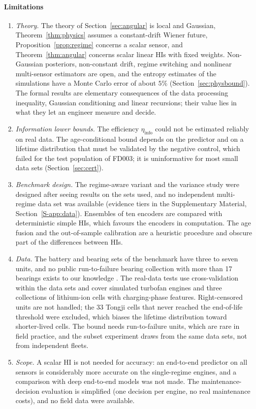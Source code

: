 \documentclass[preprint,12pt]{elsarticle}
\theoremstyle{definition}
\newcommand{\etaPIE}{\eta_{\mathrm{info}}}
\begin{document}
\paragraph{Limitations}
\begin{enumerate}
\item \emph{Theory.} The theory of Section~\ref{sec:angular} is local and Gaussian, Theorem~\ref{thm:physics} assumes a constant-drift Wiener future, Proposition~\ref{prop:regime} concerns a scalar sensor, and Theorem~\ref{thm:angular} concerns scalar linear HIs with fixed weights. Non-Gaussian posteriors, non-constant drift, regime switching and nonlinear multi-sensor estimators are open, and the entropy estimates of the simulations have a Monte Carlo error of about $5\%$ (Section~\ref{sec:physbound}). The formal results are elementary consequences of the data processing inequality, Gaussian conditioning and linear recursions; their value lies in what they let an engineer measure and decide.
\item \emph{Information lower bounds.} The efficiency $\etaPIE$ could not be estimated reliably on real data. The age-conditional bound depends on the predictor and on a lifetime distribution that must be validated by the negative control, which failed for the test population of FD003; it is uninformative for most small data sets (Section~\ref{sec:cert}).
\item \emph{Benchmark design.} The regime-aware variant and the variance study were designed after seeing results on the sets used, and no independent multi-regime data set was available (evidence tiers in the Supplementary Material, Section~\ref{S-app:data}). Ensembles of ten encoders are compared with deterministic simple HIs, which favours the encoders in computation. The age fusion and the out-of-sample calibration are a heuristic procedure and obscure part of the differences between HIs.
\item \emph{Data.} The battery and bearing sets of the benchmark have three to seven units, and no public run-to-failure bearing collection with more than 17 bearings exists to our knowledge \cite{mauthe2024}. The real-data tests use cross-validation within the data sets and cover simulated turbofan engines and three collections of lithium-ion cells with charging-phase features. Right-censored units are not handled; the $33$ Tongji cells that never reached the end-of-life threshold were excluded, which biases the lifetime distribution toward shorter-lived cells. The bound needs run-to-failure units, which are rare in field practice, and the subset experiment draws from the same data sets, not from independent fleets.
\item \emph{Scope.} A scalar HI is not needed for accuracy: an end-to-end predictor on all sensors is considerably more accurate on the single-regime engines, and a comparison with deep end-to-end models was not made. The maintenance-decision evaluation is simplified (one decision per engine, no real maintenance costs), and no field data were available.
\end{enumerate}
\end{document}
